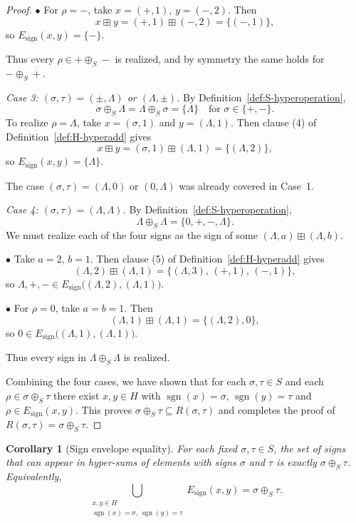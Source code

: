 \documentclass[11pt]{amsart}
\numberwithin{equation}{section}
\newtheorem{corollary}[theorem]{Corollary}
\theoremstyle{definition}
\theoremstyle{remark}
\newcommand{\Hnum}{H}                      %
\newcommand{\Sset}{S}                      %
\newcommand{\sgn}{\operatorname{sgn}}
\newcommand{\op}{\boxplus}                 %
\newcommand{\sop}{\oplus_S}                %
\begin{document}
\begin{proof}
\smallskip
\noindent
$\bullet$ For $\rho=-$, take $x=(+,1)$, $y=(-,2)$.  Then
\[
  x\op y = (+,1)\op(-,2) = \{(-,1)\},
\]
so $E_{\mathrm{sign}}(x,y)=\{-\}$.

Thus every $\rho\in+\sop-$ is realized, and by symmetry the same holds
for $-\sop+$.

\smallskip\noindent
\emph{Case 3: $(\sigma,\tau)=(\pm,\Lambda)$ or $(\Lambda,\pm)$.}
By Definition~\ref{def:S-hyperoperation},
\[
  \sigma\sop\Lambda = \Lambda\sop\sigma = \{\Lambda\}
  \quad\text{for }\sigma\in\{+,-\}.
\]
To realize $\rho=\Lambda$, take $x=(\sigma,1)$ and $y=(\Lambda,1)$.
Then clause (4) of Definition~\ref{def:H-hyperadd} gives
\[
  x\op y = (\sigma,1)\op(\Lambda,1) = \{(\Lambda,2)\},
\]
so $E_{\mathrm{sign}}(x,y)=\{\Lambda\}$.

The case $(\sigma,\tau)=(\Lambda,0)$ or $(0,\Lambda)$ was already
covered in Case~1.

\smallskip\noindent
\emph{Case 4: $(\sigma,\tau)=(\Lambda,\Lambda)$.}  By
Definition~\ref{def:S-hyperoperation},
\[
  \Lambda\sop\Lambda = \{0,+,-,\Lambda\}.
\]
We must realize each of the four signs as the sign of some
$(\Lambda,a)\op(\Lambda,b)$.

\smallskip
\noindent
$\bullet$ Take $a=2$, $b=1$.  Then clause (5) of
Definition~\ref{def:H-hyperadd} gives
\[
  (\Lambda,2)\op(\Lambda,1)
  = \{(\Lambda,3),\, (+,1),\, (-,1)\},
\]
so $\Lambda,+,-\in E_{\mathrm{sign}}\bigl((\Lambda,2),(\Lambda,1)\bigr)$.

\smallskip
\noindent
$\bullet$ For $\rho=0$, take $a=b=1$.  Then
\[
  (\Lambda,1)\op(\Lambda,1)
  = \{(\Lambda,2),0\},
\]
so $0\in E_{\mathrm{sign}}\bigl((\Lambda,1),(\Lambda,1)\bigr)$.

Thus every sign in $\Lambda\sop\Lambda$ is realized.

\smallskip

Combining the four cases, we have shown that for each
$\sigma,\tau\in\Sset$ and each $\rho\in\sigma\sop\tau$ there exist
$x,y\in\Hnum$ with $\sgn(x)=\sigma$, $\sgn(y)=\tau$ and
$\rho\in E_{\mathrm{sign}}(x,y)$.  This proves
$\sigma\sop\tau\subseteq R(\sigma,\tau)$ and completes the proof of
$R(\sigma,\tau)=\sigma\sop\tau$.
\end{proof}

\begin{corollary}[Sign envelope equality]
\label{cor:sign-envelope}
For each fixed $\sigma,\tau\in\Sset$, the set of signs that can appear
in hyper-sums of elements with signs $\sigma$ and $\tau$ is exactly
$\sigma\sop\tau$.  Equivalently,
\[
  \bigcup_{\substack{x,y\in\Hnum\\ \sgn(x)=\sigma,\ \sgn(y)=\tau}}
  E_{\mathrm{sign}}(x,y)
  = \sigma\sop\tau.
\]
\end{corollary}
\end{document}
